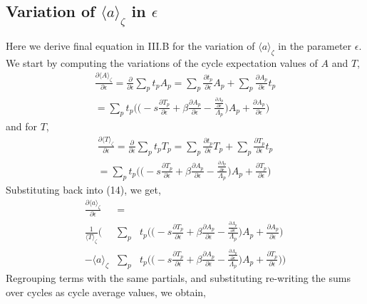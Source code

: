 \documentclass[pre,aps,twocolumn,showpacs,hyperref]{revtex4-1} %
\begin{document}
\subsection{Variation of $\langle a \rangle_{\zeta}$ in $\epsilon$}
Here we derive final equation in III.B for the variation of $\langle a\rangle_{\zeta}$ in the parameter $\epsilon$. We start by computing the variations of the cycle expectation values of $A$ and $T$,
\begin{eqnarray*}
\frac{\partial \langle A \rangle_{\zeta}}{\partial \epsilon} = \frac{\partial}{\partial \epsilon}\sum_{p}t_{p}A_{p} = \sum_{p}\frac{\partial t_{p}}{\partial \epsilon}A_{p} + \sum_{p} \frac{\partial A_{p}}{\partial \epsilon} t_{p}
\\ = \sum_{p}t_{p}\Bigg( \Bigg( -s\frac{\partial T_{p}}{\partial \epsilon} + \beta \frac{\partial A_{p}}{\partial \epsilon} - \frac{\frac{\partial \Lambda_{p}}{\partial \epsilon}}{\Lambda_{p}}\Bigg) A_{p} +\frac{\partial A_{p}}{\partial \epsilon} \Bigg)
\end{eqnarray*}
and for $T$,
\begin{eqnarray*}
\frac{\partial \langle T \rangle_{\zeta}}{\partial \epsilon} = \frac{\partial}{\partial \epsilon}\sum_{p}t_{p}T_{p} = \sum_{p}\frac{\partial t_{p}}{\partial \epsilon}T_{p} + \sum_{p} \frac{\partial T_{p}}{\partial \epsilon} t_{p}
\\ = \sum_{p}t_{p}\Bigg( \Bigg( -s\frac{\partial T_{p}}{\partial \epsilon} + \beta \frac{\partial A_{p}}{\partial \epsilon} - \frac{\frac{\partial \Lambda_{p}}{\partial \epsilon}}{\Lambda_{p}}\Bigg) A_{p} +\frac{\partial T_{p}}{\partial \epsilon} \Bigg)
\end{eqnarray*}
Substituting back into (14), we get,
\begin{eqnarray*}
\frac{\partial \langle a \rangle_{\zeta}}{\partial \epsilon} &=&
\\ \frac{1}{\langle T\rangle_{\zeta}}\Bigg( &\sum_{p}&t_{p}\Bigg( \Bigg( -s\frac{\partial T_{p}}{\partial \epsilon} + \beta \frac{\partial A_{p}}{\partial \epsilon} - \frac{\frac{\partial \Lambda_{p}}{\partial \epsilon}}{\Lambda_{p}}\Bigg) A_{p} +\frac{\partial A_{p}}{\partial \epsilon} \Bigg)
\\ - \langle a \rangle_{\zeta} &\sum_{p}&t_{p}\Bigg( \Bigg( -s\frac{\partial T_{p}}{\partial \epsilon} + \beta \frac{\partial A_{p}}{\partial \epsilon} - \frac{\frac{\partial \Lambda_{p}}{\partial \epsilon}}{\Lambda_{p}}\Bigg) A_{p} +\frac{\partial T_{p}}{\partial \epsilon} \Bigg) \Bigg)
\end{eqnarray*}
Regrouping terms with the same partials, and substituting re-writing the sums  over cycles as cycle average values, we obtain,
\end{document}
